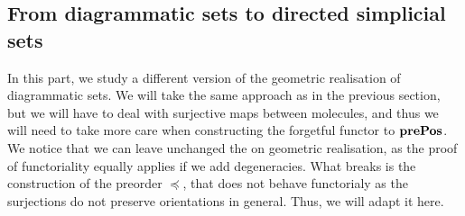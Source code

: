 \subsection{From diagrammatic sets to directed simplicial sets}

In this part, we study a different version of the geometric realisation of diagrammatic sets. We will take the same approach as in the previous section, but we will have to deal with surjective maps between molecules, and thus we will need to take more care when constructing the forgetful functor to \( \mathbf{prePos} \). We notice that we can leave unchanged the  on geometric realisation, as the proof of functoriality equally applies if we add degeneracies. What breaks is the construction of the preorder \( \preceq \), that does not behave functorialy as the surjections do not preserve orientations in general. Thus, we will adapt it here. 

